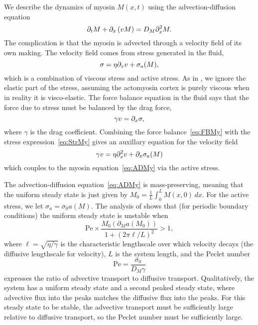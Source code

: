 \documentclass[11pt]{article}
\newcommand{\6}[1]{#1_{\text{6}}}
\newcommand{\3}[1]{#1_{\text{3}}}
\begin{document}
We describe the dynamics of myosin $M(x,t)$ using the advection-diffusion equation
\begin{equation}
\label{eq:ADMy}
\partial_t M + \partial_x \left(v M\right) = D_M \partial_x^2 M.
\end{equation}
The complication is that the myosin is advected through a velocity field of its own making. The velocity field comes from stress generated in the fluid, 
\begin{equation}
\label{eq:StrMy}
\sigma = \eta \partial_x{v} + \sigma_a(M),
\end{equation}
which is a combination of viscous stress and active stress. As in \cite{bois2011pattern}, we ignore the elastic part of the stress, assuming the actomyosin cortex is purely viscous when in reality it is visco-elastic. The force balance equation in the fluid says that the force due to stress must be balanced by the drag force, 
\begin{equation}
\label{eq:FBMy}
\gamma v = \partial_x \sigma,
\end{equation}
where $\gamma$ is the drag coefficient. Combining the force balance\ \eqref{eq:FBMy} with the stress expression\ \eqref{eq:StrMy} gives an auxillary equation for the velocity field
\begin{equation}
\gamma v = \eta \partial_x^2 v + \partial_x \sigma_a(M)
\end{equation}
which couples to the myosin equation\ \eqref{eq:ADMy} via the active stress.

The advection-diffusion equation\ \eqref{eq:ADMy} is mass-preserving, meaning that the uniform steady state is just given by $\displaystyle{M_0 = \frac{1}{L}\int_0^L M(x,0) \, dx}$. For the active stress, we let $\sigma_a=\sigma_0 a(M)$. The analysis of \cite{bois2011pattern} shows that (for periodic boundary conditions) the uniform steady state is unstable when  
\begin{equation}
\label{eq:StabBD}
\text{Pe}  \times \frac{M_0 \left(\partial_M a \left(M_0\right)\right)}{1+\left(2\pi \ell/L\right)^2} > 1,
\end{equation}
where $\ell=\sqrt{\eta/\gamma}$ is the characteristic lengthscale over which velocity decays (the diffusive lengthscale for velocity), $L$ is the system length, and the Peclet number
\begin{equation}
\text{Pe} = \frac{\sigma_0}{D_M \gamma}
\end{equation}
expresses the ratio of advective transport to diffusive transport. Qualitatively, the system has a uniform steady state and a second peaked steady state, where advective flux into the peaks matches the diffusive flux into the peaks. For this steady state to be stable, the advective transport must be sufficiently large relative to diffusive transport, so the Peclet number must be sufficiently large.
\end{document}
